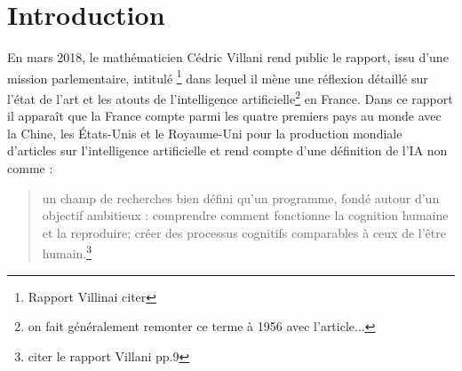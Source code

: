 \part*{Introduction}

En mars 2018, le mathématicien Cédric Villani rend public le rapport, issu d'une mission parlementaire, intitulé \footnote{Rapport Villinai citer} dans lequel il mène une réflexion détaillé sur l'état de l'art et les atouts de l'intelligence artificielle\footnote{on fait généralement remonter ce terme à 1956 avec l'article...} en France. Dans ce rapport il apparaît que la France compte parmi les quatre premiers pays au monde avec la Chine, les États-Unis et le Royaume-Uni pour la production mondiale d'articles sur l'intelligence artificielle et rend compte d'une définition de l'IA non comme :
\begin{quote}
    un champ de recherches bien défini qu'un programme, fondé autour d'un objectif ambitieux : comprendre comment fonctionne la cognition humaine et la reproduire; créer des processus cognitifs comparables à ceux de l'être humain.\footnote{citer le rapport Villani pp.9}
\end{quote}
